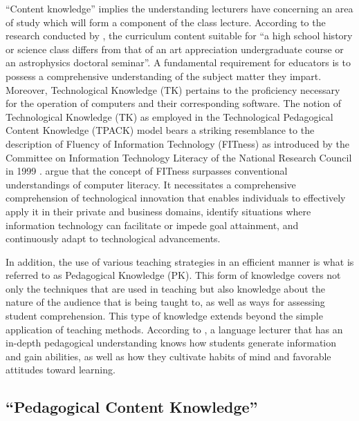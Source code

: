 \documentclass[english]{textolivre}
\begin{document}
“Content knowledge” implies the understanding lecturers have concerning an area of study which will form a component of the class lecture. According to the research conducted by \textcite{gomez-trigueros_digital_2021}, the curriculum content suitable for “a high school history or science class differs from that of an art appreciation undergraduate course or an astrophysics doctoral seminar”. A fundamental requirement for educators is to possess a comprehensive understanding of the subject matter they impart. Moreover, Technological Knowledge (TK) pertains to the proficiency necessary for the operation of computers and their corresponding software. The notion of Technological Knowledge (TK) as employed in the Technological Pedagogical Content Knowledge (TPACK) model bears a striking resemblance to the description of Fluency of Information Technology (FITness) as introduced by the Committee on Information Technology Literacy of the National Research Council in 1999 \cite[p. 78]{national_research_council_read_1999}. \textcite{hannah_inclusive_2020} argue that the concept of FITness surpasses conventional understandings of computer literacy. It necessitates a comprehensive comprehension of technological innovation that enables individuals to effectively apply it in their private and business domains, identify situations where information technology can facilitate or impede goal attainment, and continuously adapt to technological advancements.

In addition, the use of various teaching strategies in an efficient manner is what is referred to as Pedagogical Knowledge (PK). This form of knowledge covers not only the techniques that are used in teaching but also knowledge about the nature of the audience that is being taught to, as well as ways for assessing student comprehension. This type of knowledge extends beyond the simple application of teaching methods. According to \textcite{yeh_toward_2021}, a language lecturer that has an in-depth pedagogical understanding knows how students generate information and gain abilities, as well as how they cultivate habits of mind and favorable attitudes toward learning.

\subsection{“Pedagogical Content Knowledge”}
\end{document}
